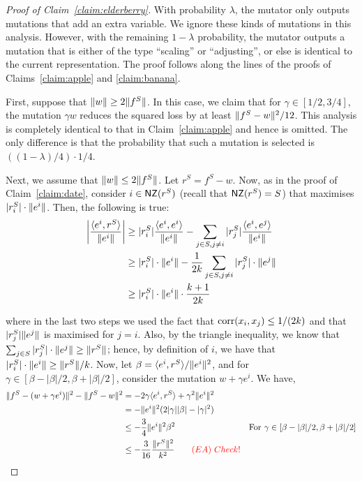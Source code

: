 \begin{proof}[Proof of Claim~\ref{claim:elderberry}] With probability $\lambda$,
the mutator only outputs mutations that add an extra variable. We ignore these
kinds of mutations in this analysis. However, with the remaining $1 - \lambda$
probability, the mutator outputs a mutation that is either of the type
``scaling'' or ``adjusting'', or else is identical to the current
representation. The proof follows along the lines of the proofs of
Claims~\ref{claim:apple} and \ref{claim:banana}.

First, suppose that
$\Vert w \Vert \geq 2 \Vert f^S \Vert$. In this case, we claim that for $\gamma
\in [1/2, 3/4]$, the mutation $\gamma w$ reduces the squared loss by at least
$\Vert f^S - w \Vert^2/12$. This analysis is completely identical to that in
Claim~\ref{claim:apple} and hence is omitted.  The only difference is that the
probability that such a mutation is selected is $((1 - \lambda)/4) \cdot 1/4$. 

Next, we assume that $\Vert w \Vert \leq 2 \Vert f^S \Vert$. Let $r^S = f^S - w$.
Now, as in the proof of Claim~\ref{claim:date}, consider $i \in \mathsf{NZ}(r^S)$ (recall
that $\mathsf{NZ}(r^S) = S$) that maximises $|r^S_i| \cdot \Vert e^i \Vert$.
Then, the following is true:
\begin{align*}
\left| \frac{\langle e^i, r^S \rangle}{\Vert e^i \Vert} \right| &\geq |r^S_i|
\frac{\langle e^i, e^i \rangle}{\Vert e^i \Vert} - \sum_{j \in S, j \neq i} |r^S_j|
\frac{\langle e^i, e^j \rangle}{\Vert e^i \Vert} \\
&\geq |r^S_i| \cdot \Vert e^i \Vert - \frac{1}{2k} \sum_{j \in S, j \neq i}
|r^S_j| \cdot \Vert e^j \Vert
\\
&\geq |r^S_i| \cdot \Vert e^i \Vert \cdot \frac{k+1}{2k}
\end{align*}

\noindent where in the last two steps we used the fact that
$\mathrm{corr}(x_i, x_j) \leq 1/(2k)$ and that $|r^S_j| \Vert e^j \Vert$ is maximised
for $j = i$.
Also, by the triangle inequality, we know that $\sum_{j \in S} |r^S_j| \cdot
\Vert e^j \Vert \geq \Vert r^S \Vert$; hence, by definition of $i$, we have that
$|r^S_i| \cdot \Vert e^i \Vert \geq \Vert r^S \Vert/k$. Now, let $\beta =
\langle e^i, r^S \rangle/\Vert e^i \Vert^2$, and for $\gamma \in [\beta - |\beta|/2, \beta +
|\beta|/2]$, consider the mutation $w + \gamma e^i$. We have,
\begin{align*}
\Vert f^S - (w + \gamma e^i) \Vert^2 - \Vert f^S - w \Vert^2 &= -2 \gamma
\langle e^i, r^S \rangle + \gamma^2 \Vert e^i \Vert^2 \\
&= - \Vert e^i \Vert^2(2 |\gamma| |\beta| - |\gamma|^2) \\
&\leq - \frac{3}{4} \Vert e^i \Vert^2 \beta^2 &\mbox{For $\gamma \in [\beta -
|\beta|/2, \beta + |\beta|/2]$} \\
&\leq - \frac{3}{16} \frac{\Vert r^S \Vert^2}{k^2} \qquad {\color{red} (EA) ~Check!}
\end{align*}


\end{proof}
